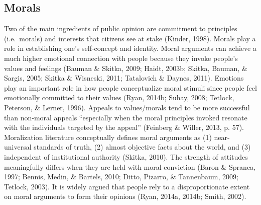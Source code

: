 \documentclass[12pt,econ]{sources/authesis}
\begin{document}
\hypertarget{framing-theory-morals}{%
\subsection{Morals}\label{framing-theory-morals}}

Two of the main ingredients of public opinion are commitment to principles (i.e.~morals) and interests that citizens see at stake (Kinder, 1998). Morals play a role in establishing one's self-concept and identity. Moral arguments can achieve a much higher emotional connection with people because they invoke people's values and feelings (Bauman \& Skitka, 2009; Haidt, 2003b; Skitka, Bauman, \& Sargis, 2005; Skitka \& Wisneski, 2011; Tatalovich \& Daynes, 2011). Emotions play an important role in how people conceptualize moral stimuli since people feel emotionally committed to their values (Ryan, 2014b; Suhay, 2008; Tetlock, Peterson, \& Lerner, 1996). Appeals to values/morals tend to be more successful than non-moral appeals ``especially when the moral principles invoked resonate with the individuals targeted by the appeal'' (Feinberg \& Willer, 2013, p. 57). Moralization literature conceptually defines moral arguments as (1) near-universal standards of truth, (2) almost objective facts about the world, and (3) independent of institutional authority (Skitka, 2010). The strength of attitudes meaningfully differs when they are held with moral conviction (Baron \& Spranca, 1997; Bennis, Medin, \& Bartels, 2010; Ditto, Pizarro, \& Tannenbaum, 2009; Tetlock, 2003). It is widely argued that people rely to a disproportionate extent on moral arguments to form their opinions (Ryan, 2014a, 2014b; Smith, 2002).
\end{document}
